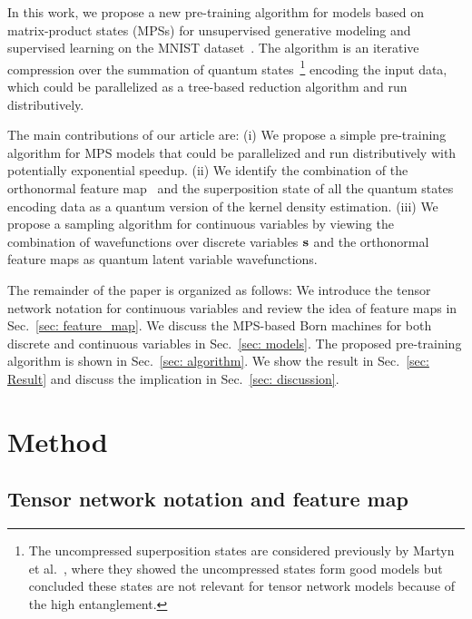\documentclass[nonatbib]{article}
\newcommand{\citep}{\cite}
\begin{document}
    
In this work, we propose a new pre-training algorithm for models based on matrix-product states (MPSs) for unsupervised generative modeling and supervised learning on the MNIST dataset~\citep{lecun2010mnist}.
The algorithm is an iterative compression over the summation of quantum states~\footnote{The uncompressed superposition states are considered previously by Martyn et al.~\cite{martyn2020entanglement}, where they showed the uncompressed states form good models but concluded these states are not relevant for tensor network models because of the high entanglement.} encoding the input data, which could be parallelized as a tree-based reduction algorithm and run distributively.

    
The main contributions of our article are:
(i) We propose a simple pre-training algorithm for MPS models that could be parallelized and run distributively with potentially exponential speedup.
(ii) We identify the combination of the orthonormal feature map~\citep{stoudenmire2016supervised} and the superposition state of all the quantum states encoding data as a quantum version of the kernel density estimation.
(iii) We propose a sampling algorithm for continuous variables by viewing the combination of wavefunctions over discrete variables ${\bf s}$ and the orthonormal feature maps as quantum latent variable wavefunctions.


The remainder of the paper is organized as follows:
We introduce the tensor network notation for continuous variables and review the idea of feature maps in Sec.~\ref{sec: feature_map}.
We discuss the MPS-based Born machines for both discrete and continuous variables in Sec.~\ref{sec: models}.
The proposed pre-training algorithm is shown in Sec.~\ref{sec: algorithm}. 
We show the result in Sec.~\ref{sec: Result} and discuss the implication in Sec.~\ref{sec: discussion}.




\section{\label{sec: Method} Method}

\subsection{Tensor network notation and feature map\label{sec: feature_map}}
\end{document}
